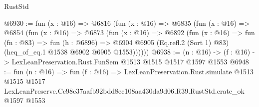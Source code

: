 \begin{lexlean}{RustStd}
\begin{coremodule}
@6930 := fun (x : @16) =>
  @6816
    (fun (x : @16) =>
    @6835
      (fun (x : @16) =>
      @6854
        (fun (x : @16) =>
        @6873
          (fun (x : @16) =>
          @6892
            (fun (x : @16) =>
            fun (fn : @83) =>
            fun (h : @6896) =>
            @6904 @6905 (Eq.refl.{2} (Sort 1) @83) (heq_of_eq.{1} @1538 @6902 @6905 @1553))))))
@6938 := (n : @16) -> (f : @16) -> LexLeanPreservation.Rust.FunSem @1513 @1515 @1517 @1597 @1553
@6948 := fun (n : @16) =>
  fun (f : @16) =>
  LexLeanPreservation.Rust.simulate
    @1513
    @1515
    @1517
    LexLeanPreserve.Cc98c37aafb92bdd8ec108aa430da9d06.R39.RustStd.crate_ok
    @1597
    @1553
\end{coremodule}
\end{lexlean}
